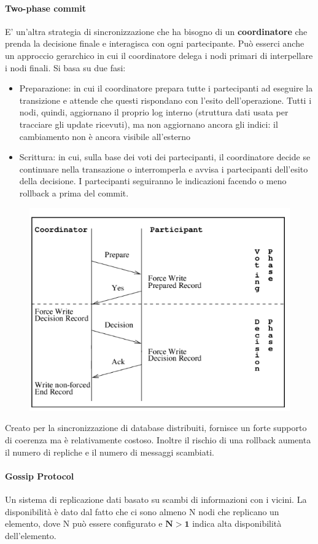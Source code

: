 \documentclass{article}
\begin{document}
		\paragraph{Two-phase commit}
		E' un'altra strategia di sincronizzazione che ha bisogno di un \textbf{coordinatore} che prenda la decisione finale e interagisca con ogni partecipante. Può esserci anche un approccio gerarchico in cui il coordinatore delega i nodi primari di interpellare i nodi finali.
		Si basa su due fasi:
		\begin{itemize}
			\item Preparazione: in cui il coordinatore prepara tutte i partecipanti ad eseguire la transizione e attende che questi rispondano con l'esito dell'operazione. Tutti i nodi, quindi, aggiornano il proprio log interno (struttura dati usata per tracciare gli update ricevuti), ma non
			aggiornano ancora gli indici: il cambiamento non è ancora visibile all’esterno
			\item Scrittura: in cui, sulla base dei voti dei partecipanti, il coordinatore decide se continuare nella transazione o interromperla e avvisa i partecipanti dell'esito della decisione. I partecipanti seguiranno le indicazioni facendo o meno rollback a prima del commit.
		\end{itemize}
		\begin{figure}[ht]
			\centering
			\includegraphics[width=0.5\linewidth]{SAC_A5_twophase}
			\label{fig:saca5twophase}
		\end{figure}
		Creato per la sincronizzazione di database distribuiti, fornisce un forte supporto di coerenza ma è relativamente costoso. Inoltre il rischio di una rollback aumenta il numero di repliche e il numero di messaggi scambiati.
		
		\paragraph{Gossip Protocol}
		Un sistema di replicazione dati basato su scambi di informazioni con i vicini. La disponibilità è dato dal fatto che ci sono almeno N nodi che replicano un elemento, dove N può essere configurato e $\mathbf{N > 1}$ indica alta disponibilità dell'elemento.\\
		
\end{document}

